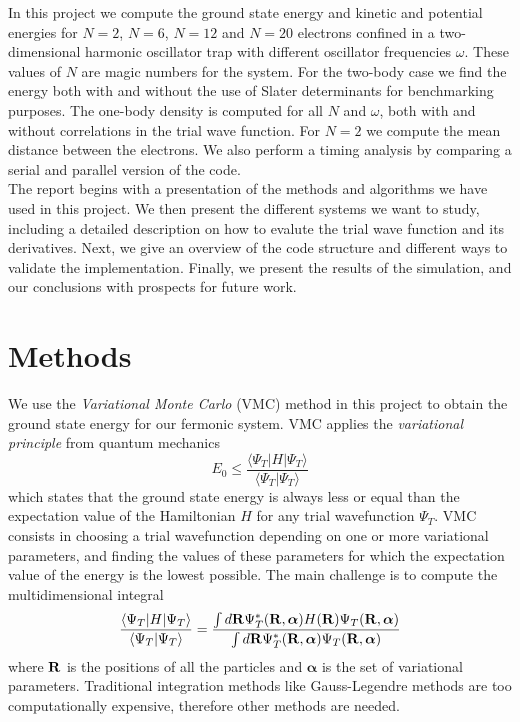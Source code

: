 \documentclass[english, a4paper]{article}
\begin{document}
\noindent In this project we compute the ground state energy and kinetic and potential energies for
$N=2$, $N=6$, $N=12$ and $N=20$ electrons
confined in a two-dimensional harmonic oscillator trap with different oscillator frequencies $\omega$.
These values of $N$ are magic numbers for the system.
For the two-body case we find the energy both with and without the use of Slater determinants for 
benchmarking purposes. The one-body density is computed for all $N$ and $\omega$, both with and without correlations
in the trial wave function. 
For $N=2$ we compute the mean distance between the electrons. We also perform a timing analysis by comparing a serial 
and parallel version of the code. \\

\noindent The report begins with a presentation of the methods and algorithms we have used in this project. 
We then present the different systems we want to study, including a detailed description on how to 
evalute the trial wave function and its derivatives. Next, we give an overview of the code structure and 
different ways to validate the implementation. Finally, we present the results of the simulation, and our conclusions
with prospects for future work. 


\section{Methods}

We use the \textit{Variational Monte Carlo} (VMC) method in this project to obtain the ground state energy
for our fermonic system. VMC applies the \textit{variational principle} from quantum mechanics
\begin{equation}
 E_0 \leq \frac{\langle \Psi_T | H | \Psi_T \rangle}{\langle \Psi_T | \Psi_T \rangle}
\end{equation}
which states that the ground state energy is always less or equal than the expectation value of the Hamiltonian $H$
for any trial wavefunction $\Psi_T$. VMC consists in choosing a trial wavefunction depending on one or more
variational parameters, and finding the values of these parameters for which the expectation value of the 
energy is the lowest possible. The main challenge is to compute the multidimensional integral
\begin{equation}
 \frac{\langle \Psi_T | H | \Psi_T \rangle}{\langle \Psi_T | \Psi_T \rangle} = 
 \frac{\int d {\bf R} \Psi_T^*({\bf R}, \boldsymbol{\alpha}) H({\bf R}) \Psi_T({\bf R}, \boldsymbol{\alpha})}
       {\int d {\bf R} \Psi_T^*({\bf R}, \boldsymbol{\alpha}) \Psi_T({\bf R}, \boldsymbol{\alpha})}
 \label{multidim}
\end{equation}
where $\bf{R}$ is the positions of all the particles and $\boldsymbol{\alpha}$ is the set of variational parameters.
Traditional integration methods like Gauss-Legendre methods are too computationally expensive, therefore 
other methods are needed.
\end{document}

